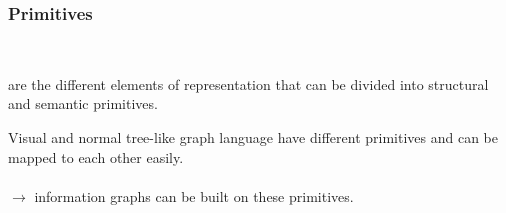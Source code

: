 \begin{frame}
  \frametitle{Primitives}
  \begin{module}[id=primitives]
		\\
		\noindent
		\begin{definition}
		   are the different elements of representation that can be divided into structural and semantic primitives.
		\end{definition}

		\noindent
		Visual and normal tree-like graph language have different primitives and can be mapped to each other easily.\\
		\\
		\noindent
		$\rightarrow$ information graphs can be built on these primitives.

  \end{module}
\end{frame}
